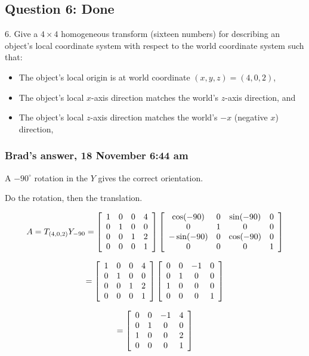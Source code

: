 \documentclass[11pt]{article}
\begin{document}
\begin{spacing}{1.2}
\subsection{Question 6:  Done}
6.  Give a $4 \times 4$ homogeneous transform (sixteen numbers) for describing an object's local coordinate system with respect to the world coordinate system such that:

\begin{itemize}
	\item The object's local origin is at world coordinate $(x,y,z) = (4,0,2)$,
	\item The object's local $x$-axis direction matches the world's $z$-axis direction, and 
	\item The object's local $z$-axis direction matches the world's $-x$ (negative $x$) direction, 
\end{itemize}

\subsubsection{Brad's answer, 18 November 6:44 am}

A $-90^{\circ}$ rotation in the $Y$ gives the correct orientation. 

Do the rotation, then the translation.  

$$A = T_{(4,0,2)} Y_{-90} = 
\left[
\begin{array}{cccc}
	1 & 0 & 0 & 4 \cr
	0 & 1 & 0 & 0 \cr
	0 & 0 & 1 & 2 \cr
	0 & 0 & 0 & 1 \cr
\end{array}
\right]
\left[
	\begin{array}{cccc}
		\cos (-90) & 0 & \sin (-90) & 0 \cr
		0 & 1 & 0 & 0 \cr
		-\sin(-90) & 0 & \cos (-90) & 0 \cr
		0 & 0 & 0 & 1 \cr
	\end{array}
\right]
$$

$$= 
\left[
\begin{array}{cccc}
	1 & 0 & 0 & 4 \cr
	0 & 1 & 0 & 0 \cr
	0 & 0 & 1 & 2 \cr
	0 & 0 & 0 & 1 \cr
\end{array}
\right]
\left[
	\begin{array}{cccc}
		0 & 0 & -1 & 0 \cr
		0 & 1 & 0 & 0 \cr
		1 & 0 & 0 & 0 \cr
		0 & 0 & 0 & 1 \cr
	\end{array}
\right]
$$

$$= 
\left[
	\begin{array}{cccc}
		0 & 0 & -1 & 4 \cr
		0 & 1 & 0 & 0 \cr
		1 & 0 & 0 & 2 \cr
		0 & 0 & 0 & 1 \cr
	\end{array}
\right]
$$


\end{spacing}
\end{document}
